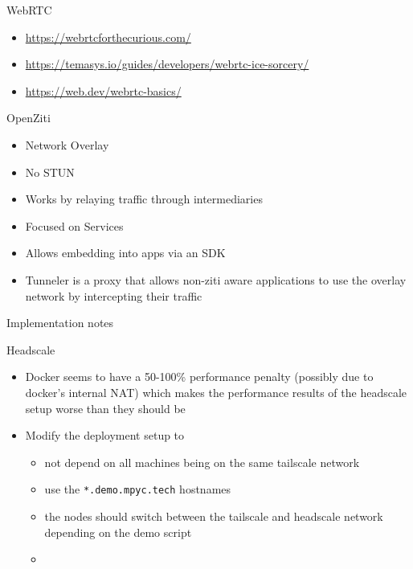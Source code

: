 \begin{block}{WebRTC}
\begin{itemize}
  \begin{itemize}
  \tightlist
  \item
    \url{https://webrtcforthecurious.com/}
  \item
    \url{https://temasys.io/guides/developers/webrtc-ice-sorcery/}
  \item
    \href{https://web.dev/webrtc-basics/\#toc-rtcpeerconnection}{https://web.dev/webrtc-basics/}
  \end{itemize}
\end{itemize}
\end{block}

\label{notes__02180-openziti.md}
\begin{block}{OpenZiti}
\label{notes__02180-openziti.md__openziti}
\begin{itemize}
\tightlist
\item
  Network Overlay
\item
  No STUN
\item
  Works by relaying traffic through intermediaries
\item
  Focused on Services
\item
  Allows embedding into apps via an SDK
\item
  Tunneler is a proxy that allows non-ziti aware applications to use the overlay network by intercepting their traffic
\end{itemize}
\end{block}

\label{notes__03000-implementations.md}
\begin{frame}[fragile]{Implementation notes}
\label{notes__03000-implementations.md__implementation-notes}
\begin{block}{Headscale}
\label{notes__03000-implementations.md__headscale}
\begin{itemize}
\tightlist
\item
  Docker seems to have a 50-100\% performance penalty (possibly due to docker's internal NAT) which makes the performance results of the headscale setup worse than they should be
\item
  Modify the deployment setup to

  \begin{itemize}
  \tightlist
  \item
    not depend on all machines being on the same tailscale network
  \item
    use the \texttt{*.demo.mpyc.tech} hostnames
  \item
    the nodes should switch between the tailscale and headscale network depending on the demo script
  \item
  \end{itemize}
\end{itemize}
\end{block}
\end{frame}

